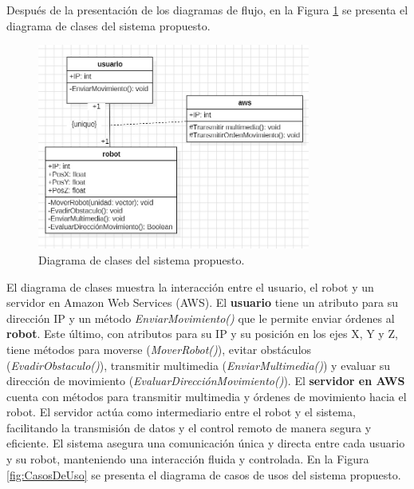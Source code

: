         \vskip 0.5cm
        \clearpage
        Despu\'es de la presentaci\'on de los diagramas de flujo, en la Figura \ref{fig:Clases} se presenta el diagrama de clases del sistema propuesto.
        \vskip 0.5cm
            \begin{figure}[htbp]
                \centering
                \includegraphics[width=0.8\textwidth]{images/desarrollo/diagramas/Clases.jpeg}
                \caption{Diagrama de clases del sistema propuesto.}
                \label{fig:Clases}
            \end{figure}
        \vskip 0.5cm
        El diagrama de clases muestra la interacci\'on entre el usuario, el robot y un servidor en Amazon Web Services (AWS). 
        El \textbf{usuario} tiene un atributo para su direcci\'on IP y un m\'etodo \textit{EnviarMovimiento()} 
        que le permite enviar \'ordenes al \textbf{robot}. Este \'ultimo, con atributos para su IP y su posici\'on en los ejes X, Y 
        y Z, tiene m\'etodos para moverse (\textit{MoverRobot()}), evitar obst\'aculos (\textit{EvadirObstaculo()}), 
        transmitir multimedia (\textit{EnviarMultimedia()}) y evaluar su direcci\'on de movimiento (\textit{EvaluarDirecci\'onMovimiento()}).
        \vskip 0.5cm
        El \textbf{servidor en AWS} cuenta con m\'etodos para transmitir multimedia y \'ordenes de movimiento hacia el robot. 
        El servidor act\'ua como intermediario entre el robot y el sistema, facilitando la transmisi\'on de datos y el control 
        remoto de manera segura y eficiente. El sistema asegura una comunicaci\'on \'unica y directa entre cada usuario y su robot, 
        manteniendo una interacci\'on fluida y controlada.
        \vskip 0.5cm
        En la Figura \ref{fig:CasosDeUso} se presenta el diagrama de casos de usos del sistema propuesto.
